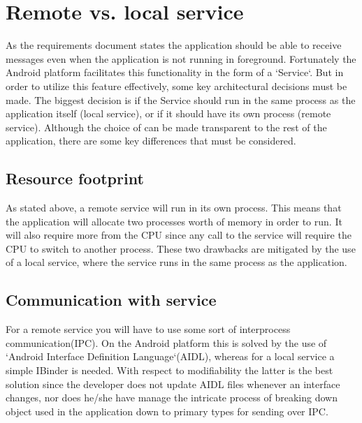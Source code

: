 

\section{Remote vs. local service}

As the requirements document states the application should be able to receive messages even when the application is not running in foreground. Fortunately the Android platform facilitates this functionality in the form of a `Service`\cite{bib:service}. But in order to utilize this feature effectively, some key architectural decisions must be made. The biggest decision is if the Service should run in the same process as the application itself (local service), or if it should have its own process (remote service). Although the choice of can be made transparent to the rest of the application, there are some key differences that must be considered.

\subsection{Resource footprint}
As stated above, a remote service will run in its own process. This means that the application will allocate two processes worth of memory in order to run. It will also require more from the CPU since any call to the service will require the CPU to switch to another process. These two drawbacks are mitigated by the use of a local service, where the service runs in the same process as the application. 

\subsection{Communication with service}
For a remote service you will have to use some sort of  interprocess communication(IPC). On the Android platform this is solved by the use of `Android Interface Definition Language`(AIDL)\cite{bib:aidl}, whereas for a local service a simple IBinder\cite{bib:ibinder} is needed. With respect to modifiability the latter is the best solution since the developer does not update AIDL files whenever an interface changes, nor does he/she have manage the intricate process of breaking down object used in the application down to primary types for sending over IPC.





